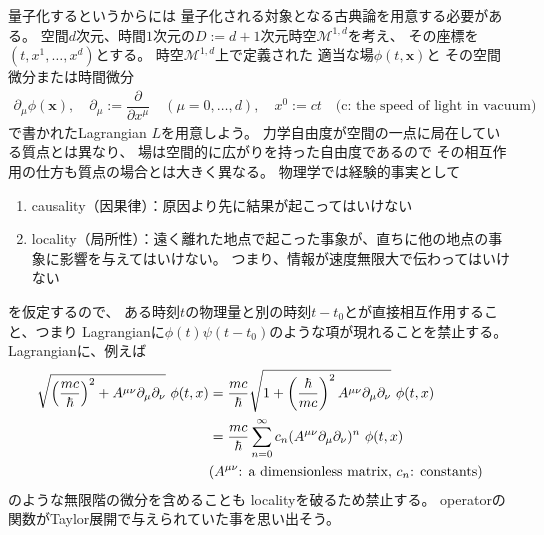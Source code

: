 量子化するというからには
量子化される対象となる古典論を用意する必要がある。
空間$d$次元、時間$1$次元の$D:= d+1$次元時空$\mathcal{M}^{1,d}$を考え、
その座標を$(t, x^1,\dots, x^d)$とする。
時空$\mathcal{M}^{1,d}$上で定義された
適当な場$\phi(t, \bm{x})$と
その空間微分または時間微分
\begin{align}
    \partial_\mu \phi(\bm{x})
    ,\quad
    \partial_\mu := \dfrac{\partial}{\partial x^\mu}
    \quad
    (\mu = 0,\dots,d)
    ,\quad
    x^0 := c t
    \quad
    \text{(c: the speed of light in vacuum)}
\end{align}
で書かれたLagrangian $L$を用意しよう。
力学自由度が空間の一点に局在している質点とは異なり、
場は空間的に広がりを持った自由度であるので
その相互作用の仕方も質点の場合とは大きく異なる。
物理学では経験的事実として
\begin{enumerate}
    \item{causality（因果律）：原因より先に結果が起こってはいけない}
    \item{locality（局所性）：遠く離れた地点で起こった事象が、直ちに他の地点の事象に影響を与えてはいけない。
    つまり、情報が速度無限大で伝わってはいけない}
\end{enumerate}
を仮定するので、
ある時刻$t$の物理量と別の時刻$t-t_0$とが直接相互作用すること、つまり
Lagrangianに$\phi(t) \psi(t-t_0)$のような項が現れることを禁止する。
Lagrangianに、例えば
\begin{align}
    \sqrt{\left(\dfrac{
        m c
    }{
        \hbar
    }\right)^2 + A^{\mu \nu}\partial_\mu \partial_\nu}
    \ \phi(t,x)
&=
    \dfrac{ m c }{ \hbar }
    \sqrt{
        1 + \left(\dfrac{ \hbar }{ m c }\right)^2
        A^{\mu \nu}\partial_\mu \partial_\nu
    }
    \ \phi(t,x)
\notag\\&= \dfrac{ m c }{ \hbar }
    \sum_{n=0}^\infty
    c_n
    (A^{\mu \nu}\partial_\mu \partial_\nu)^n
    \ \phi(t,x)
\notag\\&
\text{($A^{\mu\nu}$: a dimensionless matrix,  $c_n$: constants)}
\end{align}
のような無限階の微分を含めることも
localityを破るため禁止する。
operatorの関数がTaylor展開で与えられていた事を思い出そう。

